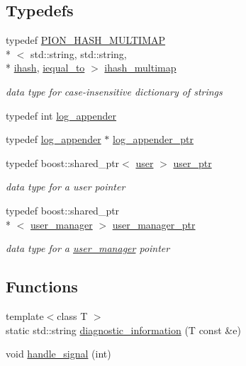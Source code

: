 \subsection*{Typedefs}
\begin{DoxyCompactItemize}
\item 
typedef \hyperlink{hash__map_8hpp_ad6156e5f37a43d2118014c45b0a0b90f}{P\-I\-O\-N\-\_\-\-H\-A\-S\-H\-\_\-\-M\-U\-L\-T\-I\-M\-A\-P}\\*
$<$ std\-::string, std\-::string, \\*
\hyperlink{structpion_1_1ihash}{ihash}, \hyperlink{structpion_1_1iequal__to}{iequal\-\_\-to} $>$ \hyperlink{namespacepion_a2cd31d7bbe0e98008bd4e6f135103c0e}{ihash\-\_\-multimap}
\begin{DoxyCompactList}\small\item\em data type for case-\/insensitive dictionary of strings \end{DoxyCompactList}\item 
typedef int \hyperlink{namespacepion_a0ae721a15721415f669eea72b5410bfb}{log\-\_\-appender}
\item 
typedef \hyperlink{namespacepion_a0ae721a15721415f669eea72b5410bfb}{log\-\_\-appender} $\ast$ \hyperlink{namespacepion_a66164fd1ba2d2866081712f2c82300d5}{log\-\_\-appender\-\_\-ptr}
\item 
typedef boost\-::shared\-\_\-ptr$<$ \hyperlink{classpion_1_1user}{user} $>$ \hyperlink{namespacepion_afd2ae32f926db1286ba2e83011456e11}{user\-\_\-ptr}
\begin{DoxyCompactList}\small\item\em data type for a user pointer \end{DoxyCompactList}\item 
typedef boost\-::shared\-\_\-ptr\\*
$<$ \hyperlink{classpion_1_1user__manager}{user\-\_\-manager} $>$ \hyperlink{namespacepion_a20602680730b88b8efd08b3730d601af}{user\-\_\-manager\-\_\-ptr}
\begin{DoxyCompactList}\small\item\em data type for a \hyperlink{classpion_1_1user__manager}{user\-\_\-manager} pointer \end{DoxyCompactList}\end{DoxyCompactItemize}
\subsection*{Functions}
\begin{DoxyCompactItemize}
\item 
{\footnotesize template$<$class T $>$ }\\static std\-::string \hyperlink{namespacepion_a50c25b08ffd02ef4d8e8ab93b713b5a0}{diagnostic\-\_\-information} (T const \&e)
\item 
void \hyperlink{namespacepion_a1de9bad9d6fe6c82f2698f3c2c927c48}{handle\-\_\-signal} (int)
\end{DoxyCompactItemize}


